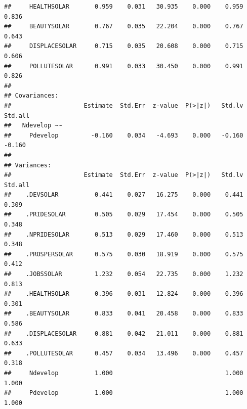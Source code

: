 \documentclass[
]{article}
\begin{document}
\begin{verbatim}
##     HEALTHSOLAR       0.959    0.031   30.935    0.000    0.959    0.836
##     BEAUTYSOLAR       0.767    0.035   22.204    0.000    0.767    0.643
##     DISPLACESOLAR     0.715    0.035   20.608    0.000    0.715    0.606
##     POLLUTESOLAR      0.991    0.033   30.450    0.000    0.991    0.826
## 
## Covariances:
##                    Estimate  Std.Err  z-value  P(>|z|)   Std.lv  Std.all
##   Ndevelop ~~                                                           
##     Pdevelop         -0.160    0.034   -4.693    0.000   -0.160   -0.160
## 
## Variances:
##                    Estimate  Std.Err  z-value  P(>|z|)   Std.lv  Std.all
##    .DEVSOLAR          0.441    0.027   16.275    0.000    0.441    0.309
##    .PRIDESOLAR        0.505    0.029   17.454    0.000    0.505    0.348
##    .NPRIDESOLAR       0.513    0.029   17.460    0.000    0.513    0.348
##    .PROSPERSOLAR      0.575    0.030   18.919    0.000    0.575    0.412
##    .JOBSSOLAR         1.232    0.054   22.735    0.000    1.232    0.813
##    .HEALTHSOLAR       0.396    0.031   12.824    0.000    0.396    0.301
##    .BEAUTYSOLAR       0.833    0.041   20.458    0.000    0.833    0.586
##    .DISPLACESOLAR     0.881    0.042   21.011    0.000    0.881    0.633
##    .POLLUTESOLAR      0.457    0.034   13.496    0.000    0.457    0.318
##     Ndevelop          1.000                               1.000    1.000
##     Pdevelop          1.000                               1.000    1.000
\end{verbatim}
\end{document}
